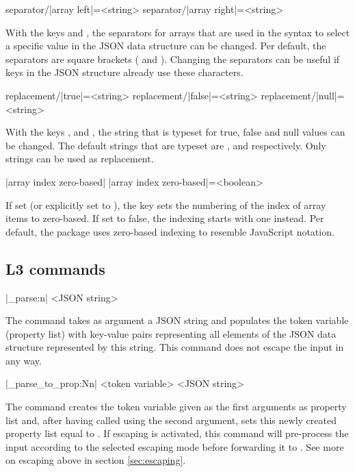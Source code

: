 \documentclass[a4paper]{article}
\begin{document}
{{\begin{macrodef}
separator/|array left|={<string>}
separator/|array right|={<string>}
\end{macrodef}
With the keys  and , the separators for arrays that are used in the syntax to select a specific value in the JSON data structure can be changed. Per default, the separators are square brackets (\macro{[} and \macro{]}). Changing the separators can be useful if keys in the JSON structure already use these characters. 

\begin{macrodef}
replacement/|true|={<string>}
replacement/|false|={<string>}
replacement/|null|={<string>}
\end{macrodef}
With the keys ,  and , the string that is typeset for true, false and null values can be changed. The default strings that are typeset are ,  and  respectively. Only strings can be used as replacement.

\begin{macrodef}
|array index zero-based|
|array index zero-based|={<boolean>}
\end{macrodef}
If set (or explicitly set to ), the key  sets the numbering of the index of array items to zero-based. If set to false, the indexing starts with one instead. Per default, the package uses zero-based indexing to resemble JavaScript notation.

\subsection{L3 commands}

\begin{macrodef}
|\jsonparse_parse:n| {<JSON string>}
\end{macrodef}
The command  takes as argument a JSON string and populates the token variable (property list)  with key-value pairs representing all elements of the JSON data structure represented by this string. This command does not escape the input in any way.
  
\begin{macrodef}
|\jsonparse_parse_to_prop:Nn| <token variable> {<JSON string>}
\end{macrodef}
The command  creates the token variable given as the first arguments as property list and, after having called  using the second argument, sets this newly created property list equal to . If escaping is activated, this command will pre-process the input according to the selected escaping mode before forwarding it to . See more on escaping above in section \ref{sec:escaping}. 

}}
\end{document}
